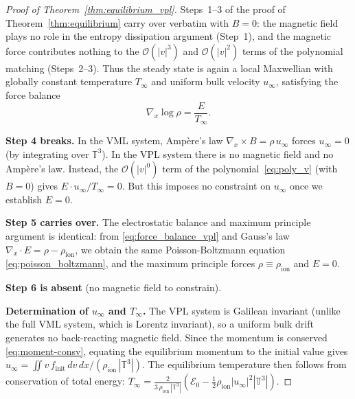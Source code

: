 \documentclass[]{article}
\numberwithin{equation}{section}
\begin{document}
\begin{proof}[Proof of Theorem~\ref{thm:equilibrium_vpl}]
Steps~1--3 of the proof of Theorem~\ref{thm:equilibrium} carry over verbatim with $B = 0$: the magnetic field plays no role in the entropy dissipation argument (Step~1), and the magnetic force contributes nothing to the $\mathcal{O}(|v|^3)$ and $\mathcal{O}(|v|^2)$ terms of the polynomial matching (Steps~2--3).  Thus the steady state is again a local Maxwellian with globally constant temperature $T_\infty$ and uniform bulk velocity $u_\infty$, satisfying the force balance
\begin{equation}
\label{eq:force_balance_vpl}
\nabla_x \log \rho = \frac{E}{T_\infty}.
\end{equation}

\textbf{Step 4 breaks.}  In the VML system, Amp\`ere's law $\nabla_x \times B = \rho \, u_\infty$ forces $u_\infty = 0$ (by integrating over $\mathbb{T}^3$).  In the VPL system there is no magnetic field and no Amp\`ere's law.  Instead, the $\mathcal{O}(|v|^0)$ term of the polynomial~\eqref{eq:poly_v} (with $B = 0$) gives $E \cdot u_\infty / T_\infty = 0$.  But this imposes no constraint on $u_\infty$ once we establish $E = 0$.

\textbf{Step 5 carries over.}  The electrostatic balance and maximum principle argument is identical: from \eqref{eq:force_balance_vpl} and Gauss's law $\nabla_x \cdot E = \rho - \rho_{\mathrm{ion}}$, we obtain the same Poisson-Boltzmann equation \eqref{eq:poisson_boltzmann}, and the maximum principle forces $\rho \equiv \rho_{\mathrm{ion}}$ and $E = 0$.

\textbf{Step 6 is absent} (no magnetic field to constrain).

\textbf{Determination of $u_\infty$ and $T_\infty$.}  The VPL system is Galilean invariant (unlike the full VML system, which is Lorentz invariant), so a uniform bulk drift generates no back-reacting magnetic field.  Since the momentum is conserved \eqref{eq:moment-consv}, equating the equilibrium momentum to the initial value gives $u_\infty = \iint v \, f_{\mathrm{init}} \, dv \, dx / (\rho_{\mathrm{ion}}\, |\mathbb{T}^3|)$.  The equilibrium temperature then follows from conservation of total energy: $T_\infty = \frac{2}{3\, \rho_{\mathrm{ion}} \, |\mathbb{T}^3|}(\mathcal{E}_0 - \frac{1}{2}\rho_{\mathrm{ion}} |u_\infty|^2 |\mathbb{T}^3|)$.


\end{proof}
\end{document}
